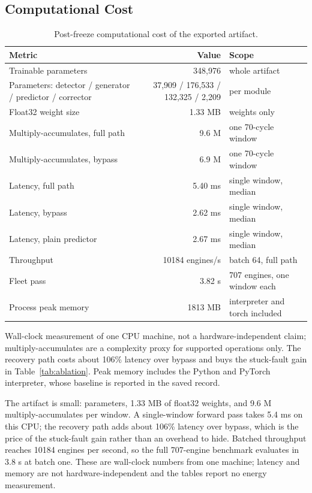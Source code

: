 \subsection{\textbf{Computational Cost}}
\newcommand{\CurrentEfficiencyTable}{%
\begin{table}[!t]
\caption{Post-freeze computational cost of the exported artifact.}
\label{tab:efficiency}
\centering\footnotesize
\setlength{\tabcolsep}{3pt}
\begin{tabular}{lrl}
\toprule
Metric & Value & Scope \\
\midrule
Trainable parameters & 348,976 & whole artifact \\
Parameters: detector / generator / predictor / corrector & 37,909 / 176,533 / 132,325 / 2,209 & per module \\
Float32 weight size & 1.33 MB & weights only \\
Multiply-accumulates, full path & 9.6 M & one 70-cycle window \\
Multiply-accumulates, bypass & 6.9 M & one 70-cycle window \\
Latency, full path & 5.40 ms & single window, median \\
Latency, bypass & 2.62 ms & single window, median \\
Latency, plain predictor & 2.67 ms & single window, median \\
Throughput & 10184 engines/s & batch 64, full path \\
Fleet pass & 3.82 s & 707 engines, one window each \\
Process peak memory & 1813 MB & interpreter and torch included \\
\bottomrule
\end{tabular}
\par\vspace{2pt}
\begin{minipage}{\textwidth}\scriptsize Wall-clock measurement of one CPU machine, not a hardware-independent claim; multiply-accumulates are a complexity proxy for supported operations only. The recovery path costs about 106\% latency over bypass and buys the stuck-fault gain in Table~\ref{tab:ablation}. Peak memory includes the Python and PyTorch interpreter, whose baseline is reported in the saved record.\end{minipage}
\end{table}
}

\CurrentEfficiencyTable
The artifact is small: \CurrentParams{} parameters, 1.33 MB of
float32 weights, and 9.6 M multiply-accumulates
per window. A single-window forward pass takes
5.4 ms on this CPU; the recovery path adds
about 106\%
latency over bypass, which is the price of the stuck-fault gain rather than an overhead to hide.
Batched throughput reaches 10184 engines per
second, so the full 707-engine benchmark evaluates in
3.8 s at batch one. These are wall-clock numbers from
one machine; latency and memory are not hardware-independent and the tables report
no energy measurement.
